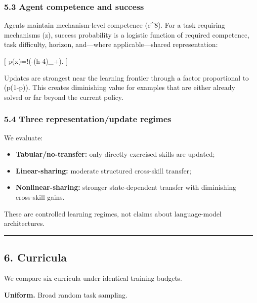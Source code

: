 \documentclass[
]{article}
\providecommand{\tightlist}{%
  \setlength{\itemsep}{0pt}\setlength{\parskip}{0pt}}
\begin{document}
\subsubsection{5.3 Agent competence and
success}\label{agent-competence-and-success}

Agents maintain mechanism-level competence (c\in[0,1]\^{}8). For a task
requiring mechanisms (z), success probability is a logistic function of
required competence, task difficulty, horizon, and---where
applicable---shared representation:

{[}
p(\mid x)=\sigma!\left(\beta{}-\eta(h-4)\_+\right).
{]}

Updates are strongest near the learning frontier through a factor
proportional to (p(1-p)). This creates diminishing value for examples
that are either already solved or far beyond the current policy.

\subsubsection{5.4 Three representation/update
regimes}\label{three-representationupdate-regimes}

We evaluate:

\begin{itemize}
\tightlist
\item
  \textbf{Tabular/no-transfer:} only directly exercised skills are
  updated;
\item
  \textbf{Linear-sharing:} moderate structured cross-skill transfer;
\item
  \textbf{Nonlinear-sharing:} stronger state-dependent transfer with
  diminishing cross-skill gains.
\end{itemize}

These are controlled learning regimes, not claims about language-model
architectures.

\begin{center}\rule{0.5\linewidth}{0.5pt}\end{center}

\subsection{6. Curricula}\label{curricula}

We compare six curricula under identical training budgets.

\textbf{Uniform.} Broad random task sampling.
\end{document}
